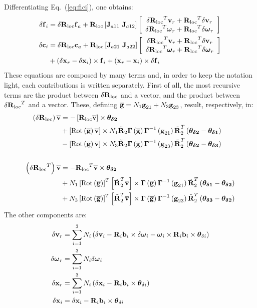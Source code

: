 Differentiating Eq.~(\ref{eq:fici}), one obtains:
\begin{align}
	\delta\bm{\mathbf{f}}_i &= \delta{\bm{\mathbf{R}}_{\text{loc}}} \bm{\mathbf{f}}_a 
		+ {\bm{\mathbf{R}}_{\text{loc}}} \left[ \bm{\mathbf{J}}_{a11}\ \bm{\mathbf{J}}_{a12} \right]
		\left[ \begin{array}{ c } 
		\delta{\bm{\mathbf{R}}_{\text{loc}}}^T\bm{\mathbf{v}}_r + {\bm{\mathbf{R}}_{\text{loc}}}^T\delta\bm{\mathbf{v}}_r\\
		\delta{\bm{\mathbf{R}}_{\text{loc}}}^T\bm{\mathbf{\omega}}_r + {\bm{\mathbf{R}}_{\text{loc}}}^T\delta\bm{\mathbf{\omega}}_r \end{array} \right]\\
\nonumber\delta\bm{\mathbf{c}}_i &= \delta{\bm{\mathbf{R}}_{\text{loc}}} \bm{\mathbf{c}}_a 
		+ {\bm{\mathbf{R}}_{\text{loc}}} \left[ \bm{\mathbf{J}}_{a21}\ \bm{\mathbf{J}}_{a22} \right]
		\left[ \begin{array}{ c } 
		\delta{\bm{\mathbf{R}}_{\text{loc}}}^T\bm{\mathbf{v}}_r + {\bm{\mathbf{R}}_{\text{loc}}}^T\delta\bm{\mathbf{v}}_r\\
		\delta{\bm{\mathbf{R}}_{\text{loc}}}^T\bm{\mathbf{\omega}}_r + {\bm{\mathbf{R}}_{\text{loc}}}^T\delta\bm{\mathbf{\omega}}_r \end{array} \right]\\
	&+ \left( \delta\bm{\mathbf{x}}_r - \delta\bm{\mathbf{x}}_i \right)\times\bm{\mathbf{f}}_i 
		+ \left( \bm{\mathbf{x}}_r - \bm{\mathbf{x}}_i \right)\times\delta\bm{\mathbf{f}}_i
\end{align}
These equations are composed by many terms and, in order to keep the
notation light, each contributions is written separately.
First of all, the most recursive terms are the product between 
$\delta{\bm{\mathbf{R}}_{\text{loc}}}$ and a vector, and the product between $\delta{\bm{\mathbf{R}}_{\text{loc}}}^T$
and a vector. These, defining $\overline{\bm{\mathbf{g}}}=N_1\bm{\mathbf{g}}_{21} 
+ N_3\bm{\mathbf{g}}_{23}$, 
result, respectively, in:
\newcommand{\vv}{\T{\overline{v}}}
\begin{align}
\nonumber	\plbr{\delta\Rloc}\vv &= 
		-\sqbr{\Rloc\vv}\times\T{\theta_{\delta 2}}\\ 
\nonumber	&+\sqbr{\Rot{\overline{\T{g}}}\vv}\times
		N_1\Rtilde{2}\T{\Gamma}\plbr{\overline{\T{g}}}
		\T{\Gamma}^{-1}\plbr{\T{g}_{21}}\Rtilde{2}^T
		\plbr{\T{\theta_{\delta 2}}-\T{\theta_{\delta 1}}}\\ 
\nonumber	&-\sqbr{\Rot{\overline{\T{g}}}\vv}\times
		N_3\Rtilde{2}\T{\Gamma}\plbr{\overline{\T{g}}}
		\T{\Gamma}^{-1}\plbr{\T{g}_{23}}\Rtilde{2}^T
		\plbr{\T{\theta_{\delta 2}}-\T{\theta_{\delta 3}}}\\ 
		\\
\nonumber	\plbr{\delta\Rloc^T}\vv &= 
		-\Rloc^T\vv\times\T{\theta_{\delta 2}}\\ 
\nonumber	&+N_1\sqbr{\Rot{\overline{\T{g}}}}^T
			\sqbr{\Rtilde{2}^T\vv}\times
		\T{\Gamma}\plbr{\overline{\T{g}}}
		\T{\Gamma}^{-1}\plbr{\T{g}_{21}}\Rtilde{2}^T
		\plbr{\T{\theta_{\delta 1}}-\T{\theta_{\delta 2}}}\\ 
\nonumber	&+N_3\sqbr{\Rot{\overline{\T{g}}}}^T
			\sqbr{\Rtilde{2}^T\vv}\times
		\T{\Gamma}\plbr{\overline{\T{g}}}
		\T{\Gamma}^{-1}\plbr{\T{g}_{23}}\Rtilde{2}^T
		\plbr{\T{\theta_{\delta 3}}-\T{\theta_{\delta 2}}}\\ 
\end{align}
The other components are:
\begin{align}
	\delta\bm{\mathbf{v}}_r &= \sum_{i=1}^3N_i\left( \delta\bm{\mathbf{v}}_i 
			- \bm{\mathbf{R}}_i\bm{\mathbf{b}}_i\times\delta\bm{\mathbf{\omega}}_i
			- \bm{\mathbf{\omega}}_i\times\bm{\mathbf{R}}_i\bm{\mathbf{b}}_i
			\times\bm{\mathbf{\theta}}_{\delta i} \right)\\
	\delta\bm{\mathbf{\omega}}_r &= \sum_{i=1}^3N_i\delta\bm{\mathbf{\omega}}_i\\ 
	\delta\bm{\mathbf{x}}_r &= \sum_{i=1}^3N_i\left( \delta\bm{\mathbf{x}}_i 
			- \bm{\mathbf{R}}_i\bm{\mathbf{b}}_i\times\bm{\mathbf{\theta}}_{\delta i} \right)\\
	\delta\bm{\mathbf{x}}_i &= \delta\bm{\mathbf{x}}_i - \bm{\mathbf{R}}_i\bm{\mathbf{b}}_i
			\times\bm{\mathbf{\theta}}_{\delta i}
\end{align}


